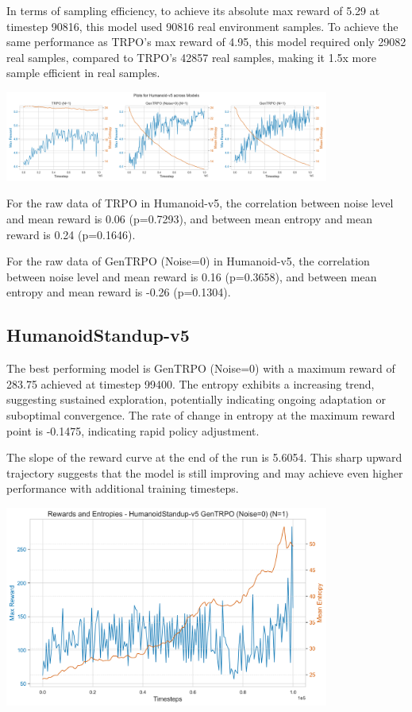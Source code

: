\documentclass{svproc}
\begin{document}
In terms of sampling efficiency, to achieve its absolute max reward of 5.29 at timestep 90816, this model used 90816 real environment samples. To achieve the same performance as TRPO's max reward of 4.95, this model required only 29082 real samples, compared to TRPO's 42857 real samples, making it 1.5x more sample efficient in real samples.

\begin{center}
\includegraphics[width=0.8\textwidth]{grid_env_Humanoid-v5.png}
\end{center}

For the raw data of TRPO in Humanoid-v5, the correlation between noise level and mean reward is 0.06 (p=0.7293), and between mean entropy and mean reward is 0.24 (p=0.1646). 

For the raw data of GenTRPO (Noise=0) in Humanoid-v5, the correlation between noise level and mean reward is 0.16 (p=0.3658), and between mean entropy and mean reward is -0.26 (p=0.1304). 

\subsection{HumanoidStandup-v5}
The best performing model is GenTRPO (Noise=0) with a maximum reward of 283.75 achieved at timestep 99400. The entropy exhibits a increasing trend, suggesting sustained exploration, potentially indicating ongoing adaptation or suboptimal convergence. The rate of change in entropy at the maximum reward point is -0.1475, indicating rapid policy adjustment.

The slope of the reward curve at the end of the run is 5.6054. This sharp upward trajectory suggests that the model is still improving and may achieve even higher performance with additional training timesteps.

\begin{center}
\includegraphics[width=0.8\textwidth]{graph_HumanoidStandup-v5_gentrpo_rewards_entropies.png}
\end{center}
\end{document}
